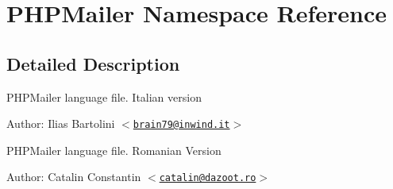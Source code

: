 \hypertarget{namespacePHPMailer}{
\section{PHPMailer Namespace Reference}
\label{namespacePHPMailer}
}




\subsection{Detailed Description}
PHPMailer language file. Italian version

\begin{Desc}
\item[Author:]Ilias Bartolini $<$\href{mailto:brain79@inwind.it}{\tt brain79@inwind.it}$>$\end{Desc}
PHPMailer language file. Romanian Version

\begin{Desc}
\item[Author:]Catalin Constantin $<$\href{mailto:catalin@dazoot.ro}{\tt catalin@dazoot.ro}$>$ \end{Desc}
